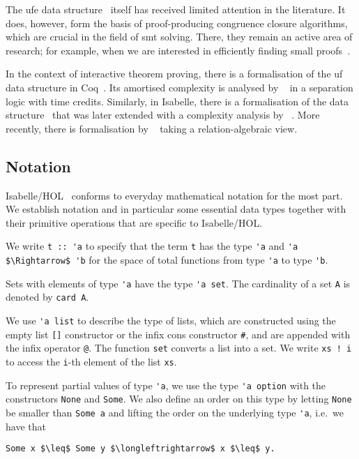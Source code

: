 \documentclass[
  sigplan,
  10pt,
  anonymous,
  review,
  ]{acmart}
\begin{document}
The \acrshort{ufe} data structure~\cite{congcl_proofs} itself has received limited attention in the literature.
It does, however, form the basis of proof-producing congruence closure algorithms, which are crucial in the field of \acrshort{smt} solving.
There, they remain an active area of research;
for example, when we are interested in efficiently finding small proofs~\cite{congcl_small_proofs}.

In the context of interactive theorem proving, there is a formalisation of the \acrshort{uf} data structure in Coq~\cite{uf_coq}.
Its amortised complexity is analysed by \citeauthor{uf_coq_time}~\cite{uf_coq_time} in a separation logic with time credits.
Similarly, in Isabelle, there is a formalisation of the data structure~\cite{uf_isabelle} that was later extended with a complexity analysis by \citeauthor{uf_isabelle_time}~\cite{uf_isabelle_time}.
More recently, there is formalisation by \citeauthor{uf_isabelle_algebraic}~\cite{uf_isabelle_algebraic} taking a relation-algebraic view.

\subsection{Notation}
Isabelle/HOL~\cite{isabelle} conforms to everyday mathematical notation for the most part.
We establish notation and in particular some essential data types together with their primitive operations that are specific to Isabelle/HOL.

We write \lstinline!t :: 'a! to specify that the term \lstinline!t! has the type \lstinline!'a! and \lstinline!'a $\Rightarrow$ 'b! for the space of total functions from type \lstinline!'a! to type \lstinline!'b!.

Sets with elements of type \lstinline!'a! have the type \lstinline!'a set!.
The cardinality of a set \lstinline!A! is denoted by \lstinline!card A!.

We use \lstinline!'a list! to describe the type of lists, which are constructed using the empty list \lstinline![]! constructor or the infix cons constructor \lstinline!#!, and are appended with the infix operator \lstinline!@!.
The function \lstinline!set! converts a list into a set.
We write \lstinline|xs ! i| to access the \lstinline|i|-th element of the list \lstinline|xs|.

To represent partial values of type \lstinline|'a|, we use the type \lstinline|'a option| with the constructors \lstinline|None| and \lstinline|Some|.
We also define an order on this type by letting \lstinline|None| be smaller than \lstinline|Some a| and lifting the order on the underlying type \lstinline|'a|, i.e.\ we have that
\begin{lstlisting}
Some x $\leq$ Some y $\longleftrightarrow$ x $\leq$ y.
\end{lstlisting}
\end{document}

